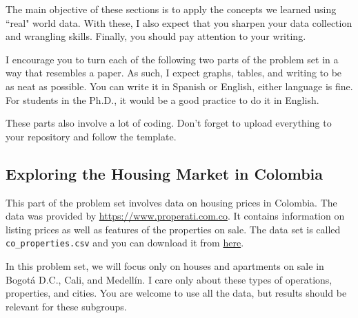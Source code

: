 \documentclass[12pt,onecolumn]{article}
\begin{document}
The main objective of these sections is to apply the concepts we learned using ``real" world data. With these, I also expect that you sharpen your data collection and wrangling skills. Finally, you should pay attention to your writing.

I encourage you to turn each of the following two parts of the problem set in a way that resembles a paper. As such, I expect graphs, tables, and writing to be as neat as possible. You can write it in Spanish or English, either language is fine. For students in the Ph.D., it would be a good practice to do it in English.

These parts also involve a lot of coding. Don't forget to upload everything to your repository and follow the template. 

\subsection{Exploring the Housing Market in Colombia}

This part of the problem set involves data on housing prices in Colombia. The data was provided by \url{https://www.properati.com.co}. It contains information on listing prices as well as features of the properties on sale. The data set is called \texttt{co\_properties.csv} and you can download it from \href{https://www.dropbox.com/s/7za955mzf7b7qti/co_properties.zip?dl=0}{here}. 


In this problem set, we will focus only on houses and apartments on sale in Bogotá D.C., Cali, and Medellín. I care only about these types of operations, properties, and cities. You are welcome to use all the data, but results should be relevant for these subgroups.
\end{document}
